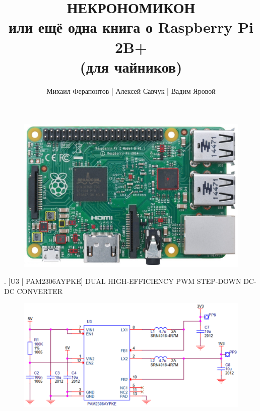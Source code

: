 


\title{НЕКРОНОМИКОН\\или ещё одна книга о Raspberry Pi 2B+\\(для чайников)}
\author{Михаил Ферапонтов | Алексей Савчук | Вадим Яровой}
\date{\the\year}



\maketitle

\newpage
\begin{figure}[H]
  \centering
  \includegraphics[width=\textwidth]{img/raspberry-photo-edited.jpg}
\end{figure}

. [U3 | PAM2306AYPKE] DUAL HIGH-EFFICIENCY PWM STEP-DOWN DC-DC CONVERTER
\begin{figure}[H]
  \centering
  \includegraphics[width=\textwidth]{img/U3.pdf}
\end{figure}

